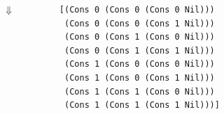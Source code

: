 \documentclass[aspectratio=169]{beamer}
\begin{document}
\begin{frame}[fragile]
\begin{columns}
    \begin{center}
      $\Downarrow$
    \end{center}

    \begin{lstlisting}
      [(Cons 0 (Cons 0 (Cons 0 Nil)))
       (Cons 0 (Cons 0 (Cons 1 Nil)))
       (Cons 0 (Cons 1 (Cons 0 Nil)))
       (Cons 0 (Cons 1 (Cons 1 Nil)))
       (Cons 1 (Cons 0 (Cons 0 Nil)))
       (Cons 1 (Cons 0 (Cons 1 Nil)))
       (Cons 1 (Cons 1 (Cons 0 Nil)))
       (Cons 1 (Cons 1 (Cons 1 Nil)))]
    \end{lstlisting}

  \end{columns}

\end{frame}
\end{document}

